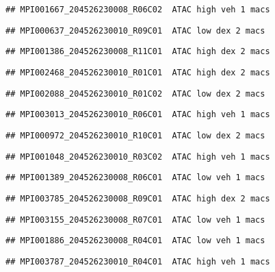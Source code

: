 \documentclass[
]{article}
\begin{document}
\begin{verbatim}
## MPI001667_204526230008_R06C02  ATAC high veh 1 macs
\end{verbatim}

\begin{verbatim}
## MPI000637_204526230010_R09C01  ATAC low dex 2 macs
\end{verbatim}

\begin{verbatim}
## MPI001386_204526230008_R11C01  ATAC high dex 2 macs
\end{verbatim}

\begin{verbatim}
## MPI002468_204526230010_R01C01  ATAC high dex 2 macs
\end{verbatim}

\begin{verbatim}
## MPI002088_204526230010_R01C02  ATAC low dex 2 macs
\end{verbatim}

\begin{verbatim}
## MPI003013_204526230010_R06C01  ATAC high veh 1 macs
\end{verbatim}

\begin{verbatim}
## MPI000972_204526230010_R10C01  ATAC low dex 2 macs
\end{verbatim}

\begin{verbatim}
## MPI001048_204526230010_R03C02  ATAC high veh 1 macs
\end{verbatim}

\begin{verbatim}
## MPI001389_204526230008_R06C01  ATAC low veh 1 macs
\end{verbatim}

\begin{verbatim}
## MPI003785_204526230008_R09C01  ATAC high dex 2 macs
\end{verbatim}

\begin{verbatim}
## MPI003155_204526230008_R07C01  ATAC low veh 1 macs
\end{verbatim}

\begin{verbatim}
## MPI001886_204526230008_R04C01  ATAC low veh 1 macs
\end{verbatim}

\begin{verbatim}
## MPI003787_204526230010_R04C01  ATAC high veh 1 macs
\end{verbatim}
\end{document}
